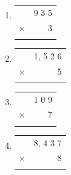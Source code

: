 \documentclass[11pt, a4paper]{article}
\begin{document}
\begin{enumerate}[label=\arabic*.]
    \vspace{1cm}
    \setcounter{enumi}{3}
    \item \begin{tabular}{c r}
          & 9 3 5 \\
        $\times$ & 3 \\ \hline
          & \\ \hline
    \end{tabular}
    \hfill
    \setcounter{enumi}{8}
    \item \begin{tabular}{c r}
          & 1, 5 2 6 \\
        $\times$ & 5 \\ \hline
          & \\ \hline
    \end{tabular}

    \vspace{1cm}
    \setcounter{enumi}{4}
    \item \begin{tabular}{c r}
          & 1 0 9 \\
        $\times$ & 7 \\ \hline
          & \\ \hline
    \end{tabular}
    \hfill
    \setcounter{enumi}{9}
    \item \begin{tabular}{c r}
          & 8, 4 3 7 \\
        $\times$ & 8 \\ \hline
          & \\ \hline
    \end{tabular}
\end{enumerate}

\pagebreak
\end{document}
